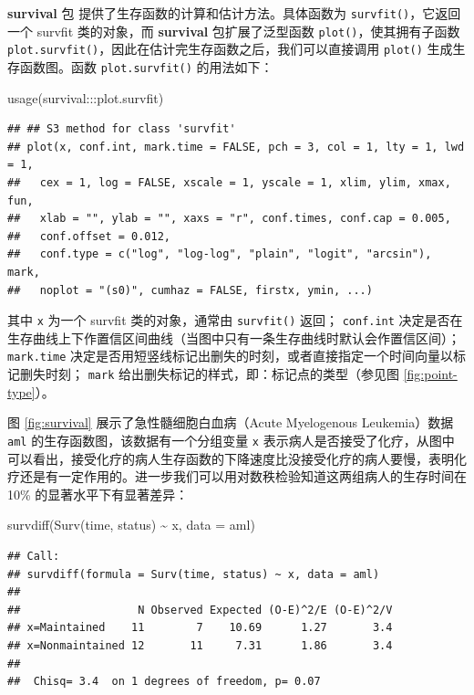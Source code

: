 \documentclass[
  b5paper,
  UTF8,twoside]{book}
\newenvironment{Shaded}{\begin{snugshade}}{\end{snugshade}}
\newcommand{\AttributeTok}[1]{\textcolor[rgb]{0.77,0.63,0.00}{#1}}
\newcommand{\FunctionTok}[1]{\textcolor[rgb]{0.00,0.00,0.00}{#1}}
\newcommand{\NormalTok}[1]{#1}
\newcommand{\SpecialCharTok}[1]{\textcolor[rgb]{0.00,0.00,0.00}{#1}}
\begin{document}
\textbf{survival} 包 \citep{survival} 提供了生存函数的计算和估计方法。具体函数为 \texttt{survfit()}，它返回一个 survfit 类的对象，而 \textbf{survival} 包扩展了泛型函数 \texttt{plot()}，使其拥有子函数 \texttt{plot.survfit()}，因此在估计完生存函数之后，我们可以直接调用 \texttt{plot()} 生成生存函数图。函数 \texttt{plot.survfit()} 的用法如下：

\begin{Shaded}
\begin{Highlighting}[]
\FunctionTok{usage}\NormalTok{(survival}\SpecialCharTok{:::}\NormalTok{plot.survfit)}
\end{Highlighting}
\end{Shaded}

\begin{verbatim}
## ## S3 method for class 'survfit'
## plot(x, conf.int, mark.time = FALSE, pch = 3, col = 1, lty = 1, lwd = 1,
##   cex = 1, log = FALSE, xscale = 1, yscale = 1, xlim, ylim, xmax, fun,
##   xlab = "", ylab = "", xaxs = "r", conf.times, conf.cap = 0.005,
##   conf.offset = 0.012,
##   conf.type = c("log", "log-log", "plain", "logit", "arcsin"), mark,
##   noplot = "(s0)", cumhaz = FALSE, firstx, ymin, ...)
\end{verbatim}

其中 \texttt{x} 为一个 survfit 类的对象，通常由 \texttt{survfit()} 返回； \texttt{conf.int} 决定是否在生存曲线上下作置信区间曲线（当图中只有一条生存曲线时默认会作置信区间）； \texttt{mark.time} 决定是否用短竖线标记出删失的时刻，或者直接指定一个时间向量以标记删失时刻； \texttt{mark} 给出删失标记的样式，即：标记点的类型（参见图 \ref{fig:point-type}）。

图 \ref{fig:survival} 展示了急性髓细胞白血病（Acute Myelogenous Leukemia）数据 \texttt{aml} 的生存函数图，该数据有一个分组变量 \texttt{x} 表示病人是否接受了化疗，从图中可以看出，接受化疗的病人生存函数的下降速度比没接受化疗的病人要慢，表明化疗还是有一定作用的。进一步我们可以用对数秩检验知道这两组病人的生存时间在 10\% 的显著水平下有显著差异：

\begin{Shaded}
\begin{Highlighting}[]
\FunctionTok{survdiff}\NormalTok{(}\FunctionTok{Surv}\NormalTok{(time, status) }\SpecialCharTok{\textasciitilde{}}\NormalTok{ x, }\AttributeTok{data =}\NormalTok{ aml)}
\end{Highlighting}
\end{Shaded}

\begin{verbatim}
## Call:
## survdiff(formula = Surv(time, status) ~ x, data = aml)
## 
##                  N Observed Expected (O-E)^2/E (O-E)^2/V
## x=Maintained    11        7    10.69      1.27       3.4
## x=Nonmaintained 12       11     7.31      1.86       3.4
## 
##  Chisq= 3.4  on 1 degrees of freedom, p= 0.07
\end{verbatim}
\end{document}
